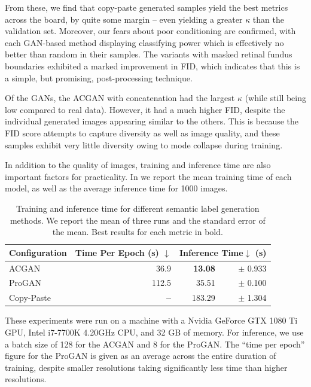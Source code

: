 From these, we find that copy-paste generated samples yield the best metrics across the board, by quite some margin -- even yielding a greater $\kappa$ than the validation set.
Moreover, our fears about poor conditioning are confirmed, with each GAN-based method displaying classifying power which is effectively no better than random in their samples.
The variants with masked retinal fundus boundaries exhibited a marked improvement in FID, which indicates that this is a simple, but promising, post-processing technique.

Of the GANs, the ACGAN with concatenation had the largest $\kappa$ (while still being low compared to real data).
However, it had a much higher FID, despite the individual generated images appearing similar to the others.
This is because the FID score attempts to capture diversity as well as image quality, and these samples exhibit very little diversity owing to mode collapse during training.

In addition to the quality of images, training and inference time are also important factors for practicality.
In  we report the mean training time of each model, as well as the average inference time for 1000 images.

\begin{table}[h]
    \centering
    \begin{tabular}{lrrr}
        \toprule
        Configuration & Time Per Epoch (s) $\downarrow$ & \multicolumn{2}{r}{Inference Time$\downarrow$ (s)} \\
        \midrule
        ACGAN & 36.9 & \textbf{13.08} & $\pm$ 0.933 \\
        \midrule
        ProGAN & 112.5 & 35.51 & $\pm$ 0.100 \\
        \midrule
        Copy-Paste & \textbf{--} & 183.29 & $\pm$ 1.304 \\
        \bottomrule
    \end{tabular}
    \caption{Training and inference time for different semantic label generation methods. We report the mean of three runs and the standard error of the mean. Best results for each metric in bold.}
    \label{tab:time}
\end{table}

These experiments were run on a machine with a Nvidia GeForce GTX 1080 Ti GPU, Intel i7-7700K 4.20GHz CPU, and 32 GB of memory.
For inference, we use a batch size of 128 for the ACGAN and 8 for the ProGAN.
The ``time per epoch'' figure for the ProGAN is given as an average across the entire duration of training, despite smaller resolutions taking significantly less time than higher resolutions.

